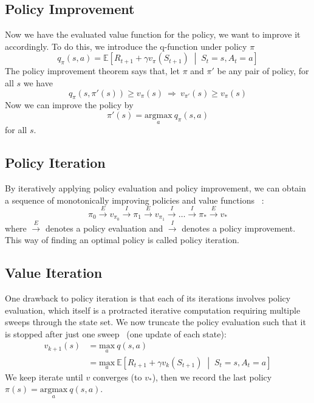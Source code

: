 \documentclass{article}
\begin{document}
\subsection{Policy Improvement}
\noindent Now we have the evaluated value function for the policy, we want to 
improve it accordingly. To do this, we introduce the q-function under 
policy \(\pi\)
\[q_\pi(s, a) = \mathbb{E}\left[R_{t+1} + \gamma v_\pi(S_{t+1})\;\middle|\;
S_t=s, A_t=a\right]\]
The policy improvement theorem says that, let \(\pi\) and \(\pi'\) be any pair
of policy, for all \(s\) we have
\[q_\pi(s, \pi'(s))\geq v_\pi(s) \:\Rightarrow\: v_{\pi'}(s) \geq v_\pi(s)\]
Now we can improve the policy by
\[\pi'(s)=\underset{a}{\text{argmax}}\:q_\pi(s,a)\]
for all \(s\).

\subsection{Policy Iteration}
\noindent By iteratively applying policy evaluation and policy improvement, we
can obtain a sequence of monotonically improving policies and value 
functions~\cite{Sutton1998} :
\[\pi_0 \overset{E}{\longrightarrow} v_{\pi_0} \overset{I}{\longrightarrow}
\pi_1 \overset{E}{\longrightarrow} v_{\pi_1} \overset{I}{\longrightarrow}
\dots \overset{I}{\longrightarrow} \pi_* \overset{E}{\longrightarrow} v_*\]
where \(\overset{E}{\longrightarrow}\) denotes a policy evaluation and
\(\overset{I}{\longrightarrow}\) denotes a policy improvement. This way of 
finding an optimal policy is called policy iteration.

\subsection{Value Iteration}
\noindent One drawback to policy iteration is that each of its iterations 
involves policy evaluation, which itself is a protracted iterative computation
requiring multiple sweeps through the state set.
\vspace{3mm}\newline We now truncate the policy evaluation such that it is
stopped after just one sweep~\cite{Sutton1998} (one update of each state):
\begin{align*}
    v_{k+1}(s)&=\underset{a}{\text{max}}\:q(s, a)\\
              &=\underset{a}{\text{max}}\:\mathbb{E}\left[
          R_{t+1}+\gamma v_k(S_{t+1})\;\middle|\;S_t=s, A_t=a\right]
\end{align*}
We keep iterate until \(v\) converges (to \(v_*\)), then we record the last
policy \(\pi(s) = \underset{a}{\text{argmax}}\:q(s, a)\).
\end{document}
